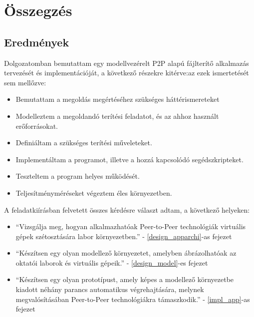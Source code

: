 \chapter{Összegzés}
\label{chp:summary}

\section{Eredmények}
 
Dolgozatomban bemutattam egy modellvezérelt P2P alapú fájlterítő alkalmazás tervezését és implementációját, a következő részekre kitérve:az ezek  ismertetését sem mellőzve:

\begin{itemize}
  \item Bemutattam a megoldás megértéséhez szükséges háttérismereteket
  \item Modelleztem a megoldandó terítési feladatot, és az ahhoz használt erőforrásokat.
  \item Definiáltam a szükséges terítési műveleteket.
  \item Implementáltam a programot, illetve a hozzá kapcsolódó segédszkripteket.
  \item Teszteltem a program helyes működését.
  \item Teljesítményméréseket végeztem éles környezetben.
\end{itemize}

A feladatkiírásban felvetett összes kérdésre választ adtam, a következő helyeken:

\begin{itemize}
  \item ``Vizsgálja  meg,  hogyan  alkalmazhatóak  Peer-to-Peer  technológiák  virtuális  gépek 
szétosztására labor környezetben.'' - \ref{design_apparchi}-as fejezet
  \item ``Készítsen  egy  olyan  modellező  környezetet,  amelyben  ábrázolhatóak  az  oktatói 
laborok és virtuális gépeik.'' - \ref{design_model}-es fejezet
  \item ``Készítsen egy olyan prototípust, amely képes a modellező környezetbe kiadott  néhány
parancs  automatikus  végrehajtására,  melynek  megvalósításában  Peer-to-Peer 
technológiákra támaszkodik.'' - \ref{impl_app}-as fejezet
\end{itemize}


